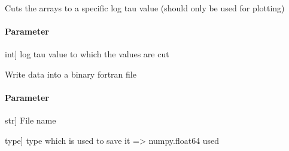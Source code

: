 \documentclass[letterpaper,10pt,english]{sphinxmanual}
\begin{document}
\begin{fulllineitems}
\begin{fulllineitems}
\begin{description}
\end{description}

\end{fulllineitems}


\begin{fulllineitems}
\label{\detokenize{classes:id23}}
\pysigstartsignatures
{}
\pysigstopsignatures
\sphinxAtStartPar
Cuts the arrays to a specific log tau value (should only be used for plotting)


\paragraph{Parameter}
\label{\detokenize{classes:id24}}\begin{description}
\sphinxlineitem{lim}{[}int{]}
\sphinxAtStartPar
log tau value to which the values are cut

\end{description}

\end{fulllineitems}


\begin{fulllineitems}
\label{\detokenize{classes:id25}}
\pysigstartsignatures
{}
\pysigstopsignatures
\sphinxAtStartPar
Write data into a binary fortran file


\paragraph{Parameter}
\label{\detokenize{classes:id26}}\begin{description}
\sphinxlineitem{fname}{[}str{]}
\sphinxAtStartPar
File name

\sphinxlineitem{fmt\_type}{[}type{]}
\sphinxAtStartPar
type which is used to save it =\textgreater{} numpy.float64 used

\end{description}

\end{fulllineitems}


\end{fulllineitems}
\end{document}
